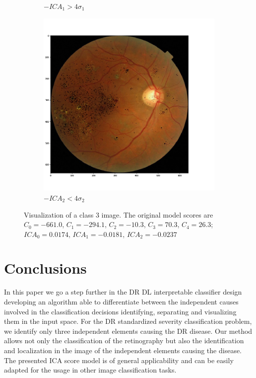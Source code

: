 \documentclass{llncs}
\begin{document}
\begin{figure}[h!]
\begin{subfigure}[b]{0.32\textwidth}
		\caption{$-ICA_1 > 4 \sigma_1$}
	\end{subfigure}
	\hfill 
	\begin{subfigure}[b]{0.32\textwidth}
		\centering
		\includegraphics[width=\textwidth]{./figures/c3/retina_mICA2.png}
		\caption{$-ICA_2 < 4 \sigma_2$}
	\end{subfigure}
	\caption{Visualization of a class 3 image. The original model scores are $C_0 = -661.0$, $C_1 = -294.1$,  $C_2 = -10.3$,   $C_3 = 70.3$,   $C_4 = 26.3$; $ICA_0 = 0.0174$, $ICA_1 = -0.0181$, $ICA_2 = -0.0237$}  
	\label{fig:ica_components_c3} 
\end{figure}

\section{Conclusions}\label{sec:conclusions}

In this paper we go a step further in the DR DL interpretable classifier design developing an algorithm able to differentiate between the independent causes involved in the classification decisions identifying, separating and visualizing them in the input space. For the DR standardized severity classification problem, we identify only three independent elements causing the DR disease. Our method allows not only the classification of the retinography but also the identification and localization in the image of the independent elements causing the disease. The presented ICA score model is of general applicability and can be easily adapted for the usage in other image classification tasks.
\end{document}
